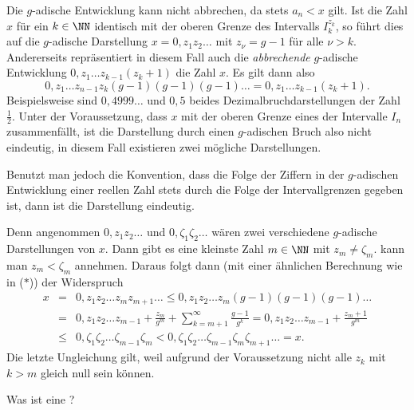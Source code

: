 \begin{antwort}
  Die $g$-adische Entwicklung {\astref} kann 
  nicht abbrechen, da stets $a_n<x$ gilt. 
  Ist die Zahl $x$ für ein $k\in\NN$  
  identisch mit der oberen Grenze des Intervalls 
  $I^{z_k}_k$, 
  so führt dies auf die $g$-adische Darstellung 
  $x=0,z_1z_2 \ldots$ mit $z_\nu=g-1$ für alle $\nu>k$. 
  Andererseits repräsentiert in 
  diesem Fall auch die \textit{abbrechende} $g$-adische 
  Entwicklung $0,z_1\ldots z_{k-1}(z_k+1)$ 
  die Zahl $x$. Es gilt dann also  
  \[
  0,z_1\ldots z_{n-1}z_k (g-1)(g-1)(g-1)\ldots = 0,z_1\ldots 
  z_{k-1}(z_k+1).
  \]
  Beispielsweise sind $0,4999\ldots$ und $0,5$ beides 
  Dezimalbruchdarstellungen der Zahl $\frac{1}{2}$. 
  Unter der Voraussetzung, dass $x$ mit der oberen Grenze 
  eines der Intervalle $I_n$ zusammenfällt, 
  ist die Darstellung durch einen $g$-adischen Bruch also 
  nicht eindeutig, in diesem Fall existieren zwei mögliche 
  Darstellungen.   

  Benutzt man jedoch die Konvention, dass die Folge der Ziffern 
  in der $g$-adischen Entwicklung einer reellen 
  Zahl stets durch die Folge der  
  Intervallgrenzen gegeben ist, dann ist die Darstellung eindeutig. 

  Denn angenommen $0,z_1z_2\ldots $ und $0,\zeta_1\zeta_2\ldots $ 
  wären zwei verschiedene $g$-adische Darstellungen von $x$. Dann gibt es eine 
  kleinste Zahl $m\in\NN$ mit $z_m \not= \zeta_m$. 
  {\OBdA} kann man $z_m < \zeta_m$ annehmen. Daraus folgt dann 
  (mit einer ähnlichen Berechnung wie in ($\ast$)) der 
  Widerspruch
  \begin{eqnarray*}
    x &=& 0,z_1z_2\ldots z_mz_{m+1} \ldots \le 
    0,z_1z_2\ldots z_m(g-1)(g-1)(g-1) \ldots \\
    &=&
    0,z_1z_2\ldots z_{m-1}+\frac{z_m}{g^m}+
    \sum_{k=m+1}^\infty \frac{g-1}{g^k}
    = 
    0,z_1z_2\ldots z_{m-1}+\frac{z_m+1}{g^m}
    \\
    &\le& 
    0,\zeta_1\zeta_2\ldots \zeta_{m-1}\zeta_m 
    <0,\zeta_1\zeta_2\ldots \zeta_{m-1}\zeta_m\zeta_{m+1}\ldots = x.
  \end{eqnarray*}
  Die letzte Ungleichung gilt, weil aufgrund der Voraussetzung 
  nicht alle $z_k$ mit $k>m$ gleich null sein können. 
  \AntEnd  
\end{antwort}

\begin{frage}
  Was ist eine ?
\end{frage}

